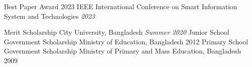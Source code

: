 

\begin{cvhonors}

\cvhonor
    {Best Paper Award} %
    {2023 IEEE International Conference on Smart Information System and Technologies}
    {} %
    {\textit{2023}} %
    
\cvhonor
    {Merit Scholarship} %
    {City University, Bangladesh}
    {} %
    {\textit{Summer 2020}} %
\cvhonor
    {Junior School Government Scholarship} %
    {Ministry of Education, Bangladesh}
    {} %
    {2012} %
\cvhonor
    {Primary School Government Scholarship} %
    {Ministry of Primary and Mass Education, Bangladesh}
    {} %
    {2009} %

\end{cvhonors}